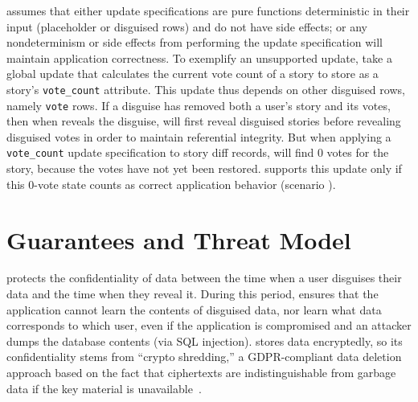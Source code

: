 %
\sys assumes that either \one{} update specifications are pure functions deterministic in
their input (placeholder or disguised rows) and do not have side effects; or
\two{} any nondeterminism or side effects from performing the update specification will
maintain application correctness.
%
To exemplify an unsupported update, take a global update that calculates the
current vote count of a story to store as a story's \texttt{vote\_count}
attribute. 
%
This update thus depends on other disguised rows, namely \texttt{vote} rows.
%
If a disguise has removed both a user's story and its votes,
then when \sys reveals the disguise, \sys will first reveal disguised 
stories before revealing disguised votes in order to maintain referential
integrity. 
%
But when applying a \texttt{vote\_count} update specification to story diff
records, \sys will find 0 votes for the story, because the votes have not yet
been restored.
%
\sys supports this update only if this 0-vote state counts as correct application behavior (scenario
\two{}).
%


\section{Guarantees and Threat Model}
\label{s:threat}
%
%
%
\sys protects the confidentiality of \xxed data between the time when a user
disguises their data and the time when they reveal it.
%
%
During this period, \sys ensures that the application cannot learn the contents of
disguised data, nor learn what \xxed data corresponds to which user, even if the
application is compromised and an attacker dumps the database contents (\eg via
SQL injection).
%
\sys stores \xxed data encryptedly, so its confidentiality stems from ``crypto
shredding,'' a GDPR-compliant data deletion approach based on the fact that
ciphertexts are indistinguishable from garbage data if the key material is
unavailable~\cite{dnefs,townsend:cryptoshredding,aws:cryptoshredding,gtr:cryptoshredding}.
%

